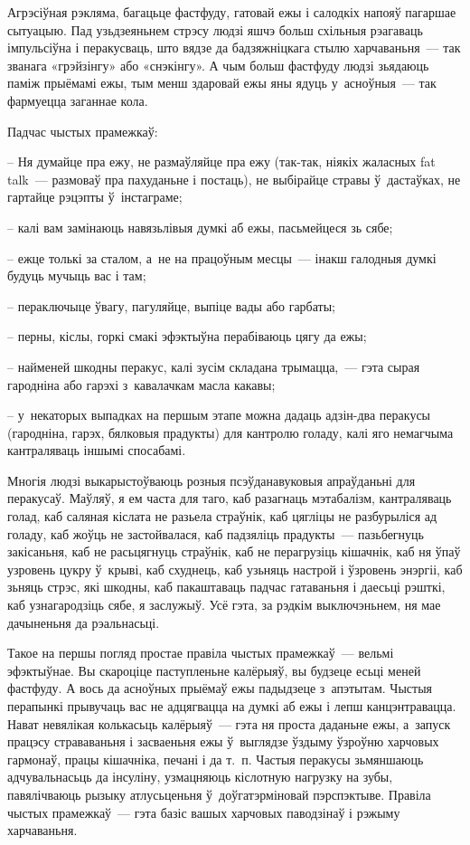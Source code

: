 Агрэсіўная рэкляма, багацьце фастфуду, гатовай ежы і салодкіх напояў пагаршае сытуацыю. Пад узьдзеяньнем стрэсу людзі яшчэ больш схільныя рэагаваць імпульсіўна і перакусваць, што вядзе да бадзяжніцкага стылю харчаваньня~--- так званага «грэйзінгу» або «снэкінгу». А чым больш фастфуду людзі зьядаюць паміж прыёмамі ежы, тым менш здаровай ежы яны ядуць у~асноўныя~--- так фармуецца заганнае кола.

Падчас чыстых прамежкаў: 

– Ня думайце пра ежу, не размаўляйце пра ежу (так-так, ніякіх жаласных fat talk~--- размоваў пра пахуданьне і постаць), не выбірайце стравы ў~дастаўках, не гартайце рэцэпты ў~інстаграме;

– калі вам замінаюць навязьлівыя думкі аб ежы, пасьмейцеся зь сябе;

– ежце толькі за сталом, а~не на працоўным месцы~--- інакш галодныя думкі будуць мучыць вас і там;

– пераключыце ўвагу, пагуляйце, выпіце вады або гарбаты;

– перны, кіслы, горкі смакі эфэктыўна перабіваюць цягу да ежы;

– найменей шкодны перакус, калі зусім складана трымацца,~--- гэта сырая гародніна або гарэхі з~кавалачкам масла какавы;

– у~некаторых выпадках на першым этапе можна дадаць адзін-два перакусы (гародніна, гарэх, бялковыя прадукты) для кантролю голаду, калі яго немагчыма кантраляваць іншымі спосабамі.

Многія людзі выкарыстоўваюць розныя псэўданавуковыя апраўданьні для перакусаў. Маўляў, я ем часта для таго, каб разагнаць мэтабалізм, кантраляваць голад, каб саляная кіслата не разьела страўнік, каб цягліцы не разбурыліся ад голаду, каб жоўць не застойвалася, каб падзяліць прадукты~--- пазьбегнуць закісаньня, каб не расьцягнуць страўнік, каб не перагрузіць кішачнік, каб ня ўпаў узровень цукру ў~крыві, каб схуднець, каб узьняць настрой і ўзровень энэргіі, каб зьняць стрэс, які шкодны, каб пакаштаваць падчас гатаваньня і даесьці рэшткі, каб узнагародзіць сябе, я заслужыў. Усё гэта, за рэдкім выключэньнем, ня мае дачыненьня да рэальнасьці.

Такое на першы погляд простае правіла чыстых прамежкаў~--- вельмі эфэктыўнае. Вы скароціце паступленьне калёрыяў, вы будзеце есьці меней фастфуду. А вось да асноўных прыёмаў ежы падыдзеце з~апэтытам. Чыстыя перапынкі прывучаць вас не адцягвацца на думкі аб ежы і лепш канцэнтравацца. Нават невялікая колькасьць калёрыяў~--- гэта ня проста даданьне ежы, а~запуск працэсу страваваньня і засваеньня ежы ў~выглядзе ўздыму ўзроўню харчовых гармонаў, працы кішачніка, печані і да т.~п. Частыя перакусы зьмяншаюць адчувальнасьць да інсуліну, узмацняюць кіслотную нагрузку на зубы, павялічваюць рызыку атлусьценьня ў~доўгатэрміновай пэрспэктыве. Правіла чыстых прамежкаў~--- гэта базіс вашых харчовых паводзінаў і рэжыму харчаваньня.


